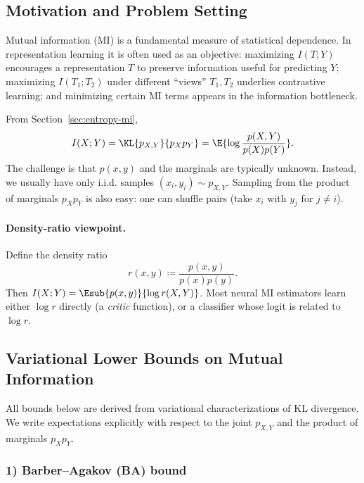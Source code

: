 
\subsection{Motivation and Problem Setting}
\label{sec:mi-est-motivation}

Mutual information (MI) is a fundamental measure of statistical dependence.
In representation learning it is often used as an objective:
maximizing $I(T;Y)$ encourages a representation $T$ to preserve information useful for predicting $Y$;
maximizing $I(T_1;T_2)$ under different ``views'' $T_1,T_2$ underlies contrastive learning;
and minimizing certain MI terms appears in the information bottleneck.

From Section~\ref{sec:entropy-mi},
\begin{equation}
    I(X;Y) = \KL{p_{X,Y}}{p_X p_Y} = \E{\log\frac{p(X,Y)}{p(X)p(Y)}}.
\end{equation}
The challenge is that $p(x,y)$ and the marginals are typically unknown.
Instead, we usually have only i.i.d. samples
\((x_i,y_i)\sim p_{X,Y}\).
Sampling from the product of marginals $p_Xp_Y$ is also easy: one can shuffle pairs (take $x_i$ with $y_j$ for $j\neq i$).

\paragraph{Density-ratio viewpoint.}
Define the density ratio
\begin{equation}
    r(x,y)\coloneqq \frac{p(x,y)}{p(x)p(y)}.
\end{equation}
Then $I(X;Y)=\Esub{p(x,y)}{\log r(X,Y)}$.
Most neural MI estimators learn either $\log r$ directly (a \emph{critic} function), or a classifier whose logit is related to $\log r$.

\subsection{Variational Lower Bounds on Mutual Information}
\label{sec:mi-est-bounds}

All bounds below are derived from variational characterizations of KL divergence.
We write expectations explicitly with respect to the joint $p_{X,Y}$ and the product of marginals $p_Xp_Y$.

\subsubsection*{1) Barber--Agakov (BA) bound}

